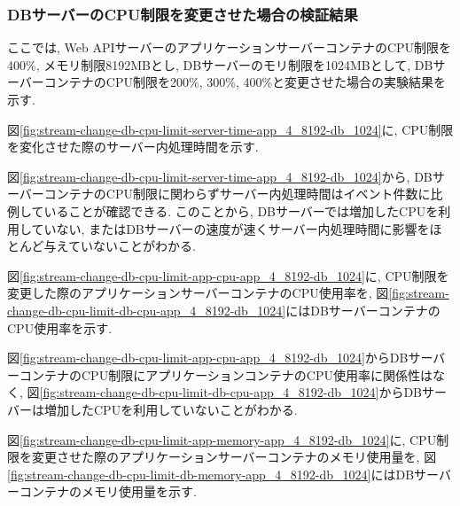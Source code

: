 \documentclass[../../../../main]{subfiles}
\begin{document}
    \subsubsection{DBサーバーのCPU制限を変更させた場合の検証結果}\label{subsubsec:result-streaming-change-db-cpu}

    ここでは, Web APIサーバーのアプリケーションサーバーコンテナのCPU制限を400\%, メモリ制限8192MBとし, DBサーバーのモリ制限を1024MBとして, DBサーバーコンテナのCPU制限を200\%, 300\%, 400\%と変更させた場合の実験結果を示す.


    図\ref{fig:stream-change-db-cpu-limit-server-time-app_4_8192-db_1024}に, CPU制限を変化させた際のサーバー内処理時間を示す.

    

    図\ref{fig:stream-change-db-cpu-limit-server-time-app_4_8192-db_1024}から, DBサーバーコンテナのCPU制限に関わらずサーバー内処理時間はイベント件数に比例していることが確認できる. このことから, DBサーバーでは増加したCPUを利用していない, またはDBサーバーの速度が速くサーバー内処理時間に影響をほとんど与えていないことがわかる.


    図\ref{fig:stream-change-db-cpu-limit-app-cpu-app_4_8192-db_1024}に, CPU制限を変更した際のアプリケーションサーバーコンテナのCPU使用率を, 図\ref{fig:stream-change-db-cpu-limit-db-cpu-app_4_8192-db_1024}にはDBサーバーコンテナのCPU使用率を示す.

    

    

    図\ref{fig:stream-change-db-cpu-limit-app-cpu-app_4_8192-db_1024}からDBサーバーコンテナのCPU制限にアプリケーションコンテナのCPU使用率に関係性はなく, 図\ref{fig:stream-change-db-cpu-limit-db-cpu-app_4_8192-db_1024}からDBサーバーは増加したCPUを利用していないことがわかる.


    図\ref{fig:stream-change-db-cpu-limit-app-memory-app_4_8192-db_1024}に, CPU制限を変更させた際のアプリケーションサーバーコンテナのメモリ使用量を, 図\ref{fig:stream-change-db-cpu-limit-db-memory-app_4_8192-db_1024}にはDBサーバーコンテナのメモリ使用量を示す.

    
\end{document}
